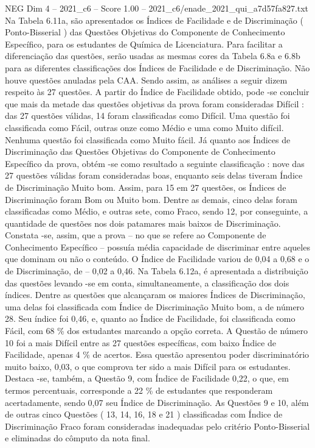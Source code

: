 \begin{textsample}{NEG Dim 4 – 2021\_c6 – Score 1.00 – 2021\_c6/enade\_2021\_qui\_a7d57fa827.txt}
Na Tabela 6.11a, são apresentados os Índices de Facilidade e de Discriminação ( Ponto-Bisserial ) das Questões Objetivas do Componente de Conhecimento Específico, para os estudantes de Química de Licenciatura.
Para facilitar a diferenciação das questões, serão usadas as mesmas cores da Tabela 6.8a e 6.8b para as diferentes classificações dos Índices de Facilidade e de Discriminação.
Não houve questões anuladas pela CAA.
Sendo assim, as análises a seguir dizem respeito às 27 questões.
A partir do Índice de Facilidade obtido, pode -se concluir que mais da metade das questões objetivas da prova foram consideradas Difícil : das 27 questões válidas, 14 foram classificadas como Difícil.
Uma questão foi classificada como Fácil, outras onze como Médio e uma como Muito difícil.
Nenhuma questão foi classificada como Muito fácil.
Já quanto aos Índices de Discriminação das Questões Objetivas do Componente de Conhecimento Específico da prova, obtém -se como resultado a seguinte classificação : nove das 27 questões válidas foram consideradas boas, enquanto seis delas tiveram Índice de Discriminação Muito bom.
Assim, para 15 em 27 questões, os Índices de Discriminação foram Bom ou Muito bom.
Dentre as demais, cinco delas foram classificadas como Médio, e outras sete, como Fraco, sendo 12, por conseguinte, a quantidade de questões nos dois patamares mais baixos de Discriminação.
Constata -se, assim, que a prova – no que se refere ao Componente de Conhecimento Específico – possuía média capacidade de discriminar entre aqueles que dominam ou não o conteúdo.
O Índice de Facilidade variou de 0,04 a 0,68 e o de Discriminação, de – 0,02 a 0,46.
Na Tabela 6.12a, é apresentada a distribuição das questões levando -se em conta, simultaneamente, a classificação dos dois índices.
Dentre as questões que alcançaram os maiores Índices de Discriminação, uma delas foi classificada com Índice de Discriminação Muito bom, a de número 28.
Seu índice foi 0,46, e, quanto ao Índice de Facilidade, foi classificada como Fácil, com 68 \% dos estudantes marcando a opção correta.
A Questão de número 10 foi a mais Difícil entre as 27 questões específicas, com baixo Índice de Facilidade, apenas 4 \% de acertos.
Essa questão apresentou poder discriminatório muito baixo, 0,03, o que comprova ter sido a mais Difícil para os estudantes.
Destaca -se, também, a Questão 9, com Índice de Facilidade 0,22, o que, em termos percentuais, corresponde a 22 \% de estudantes que responderam acertadamente, sendo 0,07 seu Índice de Discriminação.
As Questões 9 e 10, além de outras cinco Questões ( 13, 14, 16, 18 e 21 ) classificadas com Índice de Discriminação Fraco foram consideradas inadequadas pelo critério Ponto-Bisserial e eliminadas do cômputo da nota final.

\end{textsample}

